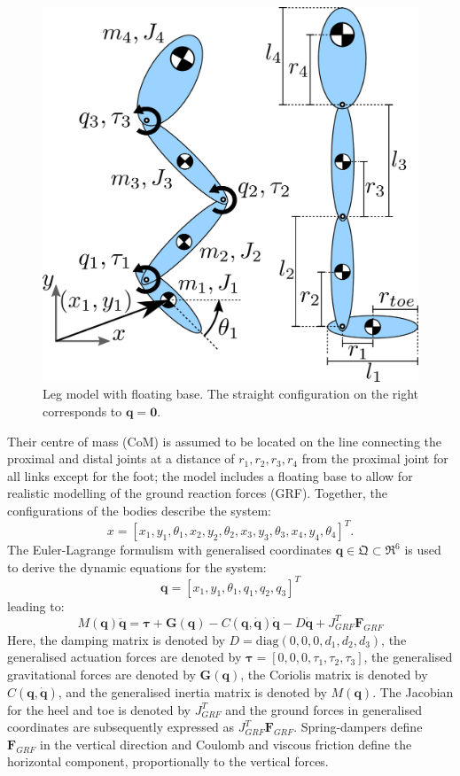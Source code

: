 \documentclass[letterpaper, 10 pt, conference]{ieeeconf}  %
\begin{document}
\begin{figure}[ht]
	\centering
	\includegraphics[width=0.7\linewidth]{Leg_3DoF_model}
	\caption{Leg model with floating base. The straight configuration on
		the right corresponds to $\mathbf{q} = \mathbf{0}$.}
	\label{fig:Leg_3DoF_model}
\end{figure}

Their centre of mass (CoM) is assumed to be located on the line connecting the proximal and distal joints at a distance of $r_1,r_2,r_3,r_4$ from the proximal joint for all links except for the foot; the model includes a floating base to allow for realistic modelling of the ground reaction forces (GRF). Together, the configurations of the bodies describe the system:
\begin{equation}
x = [x_1,y_1,\theta_1,x_2,y_2,\theta_2, x_3,y_3,\theta_3,x_4,y_4,\theta_4]^T. 
\end{equation}
The Euler-Lagrange formulism with generalised coordinates $\mathbf{q} \in \mathfrak{Q} \subset \mathfrak{R}^{6}$ is used to derive the dynamic equations for the system:
\begin{equation}
\mathbf{q}=[x_1,y_1,\theta_1,q_1,q_2,q_3]^T \label{eq:q}
\end{equation}
leading to:
\begin{equation}
M(\mathbf{q})\mathbf{\ddot q} = \mathbf{\boldsymbol{\tau} + G(q)} - C\mathbf{(q,\dot q)\dot q -} D \mathbf{\dot q} + J_{GRF}^T \mathbf{F}_{GRF}
\label{eq:fwddyn}
\end{equation}
Here, the damping matrix is denoted by $D = \text{diag} (0,0,0,d_1,d_2,d_3)$, the generalised actuation forces are denoted by $\boldsymbol{\tau} = [0,0,0,\tau_1,\tau_2,\tau_3]$, the generalised gravitational forces are denoted by $\mathbf{G(q)}$, the Coriolis matrix is denoted by $C\mathbf{(q, \dot q)}$, and the generalised inertia matrix is denoted by $M(\mathbf{q})$. The Jacobian for the heel and toe is denoted by $J_{GRF}^T$ and the ground forces in generalised coordinates are subsequently expressed as $J_{GRF}^T \mathbf{F}_{GRF}$. Spring-dampers define $\mathbf{F}_{GRF}$ in the vertical direction and Coulomb and viscous friction define the horizontal component, proportionally to the vertical forces.
\end{document}
